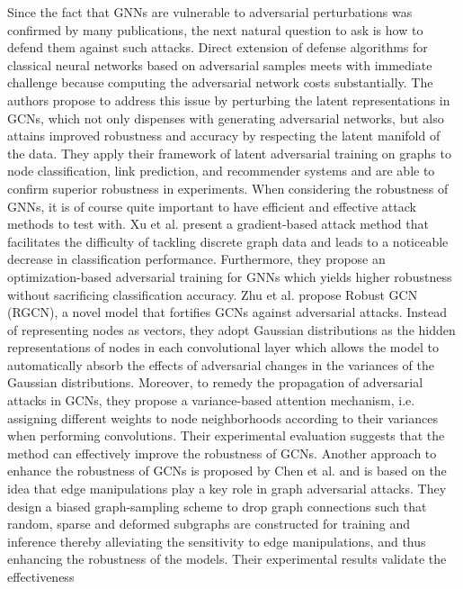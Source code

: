 \documentclass[a4paper,preprint]{sig-alternate}
\begin{document}
Since the fact that GNNs are vulnerable to adversarial perturbations was confirmed by many publications, the next natural question to ask
is how to defend them against such attacks. 
Direct extension of defense algorithms for classical neural networks based on adversarial samples meets with immediate challenge because
computing the adversarial network costs substantially. \cite{Jin2020} The authors propose to address this issue by perturbing the latent 
representations in GCNs, which not only dispenses with generating adversarial networks, but also attains improved robustness and accuracy 
by respecting the latent manifold of the data. They apply their framework of latent adversarial training on graphs to node classification,
link prediction, and recommender systems and are able to confirm superior robustness in experiments.
When considering the robustness of GNNs, it is of course quite important to have efficient and effective attack methods to test with.
Xu et al. \cite{xu2019topology} present a gradient-based attack method that facilitates the difficulty of tackling discrete graph data
and leads to a noticeable decrease in classification performance. Furthermore, they propose an optimization-based adversarial training
for GNNs which yields higher robustness without sacrificing classification accuracy.\newline
Zhu et al. \cite{10.1145/3292500.3330851} propose Robust GCN (RGCN), a novel model that fortifies GCNs against adversarial attacks.
Instead of representing  nodes as vectors, they adopt Gaussian distributions as the hidden representations of nodes in each
convolutional layer which allows the model to automatically absorb the effects of adversarial changes in the variances of the Gaussian distributions.
Moreover, to remedy the propagation of adversarial attacks in GCNs, they propose a variance-based attention mechanism, i.e. assigning different
weights to node neighborhoods according to their variances when performing convolutions. Their experimental evaluation suggests that
the method can effectively improve the robustness of GCNs.\newline
Another approach to enhance the robustness of GCNs is proposed by Chen et al. \cite{Chen2020} and is based on the idea that
edge manipulations play a key role in graph adversarial attacks. They design a biased graph-sampling scheme to drop graph connections
such that random, sparse and deformed subgraphs are constructed for training and inference thereby alleviating the sensitivity 
to edge manipulations, and thus enhancing the robustness of the models. Their experimental results validate the effectiveness 
\end{document}
